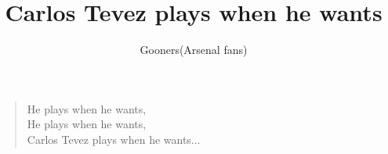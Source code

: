 \documentclass[a4paper,12pt]{article}
\title{Carlos Tevez plays when he wants}
\author{Gooners(Arsenal fans)}
\date{}
\begin{document}
	
	\maketitle
	
	\begin{verse}
		
		He plays when he wants, \\ 
		He plays when he wants, \\
		Carlos Tevez plays when he wants$\ldots$
		
	\end{verse}
	
\end{document}
